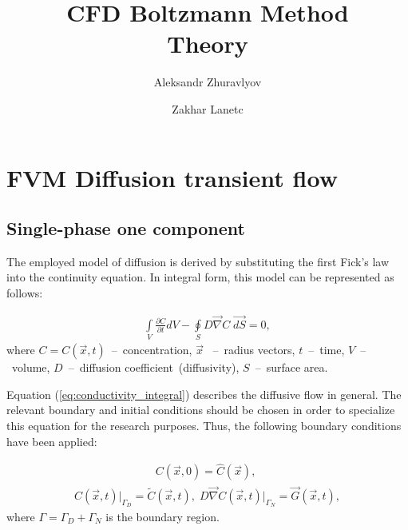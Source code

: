 \documentclass[a4paper,14pt,english]{extreport}
\author{Aleksandr Zhuravlyov \and Zakhar Lanetc}
\title{CFD Boltzmann Method\\Theory}
\date{\DTMnow}
\begin{document}
    \pagecolor{pageColor}
    \color{fontColor}

    \section*{FVM Diffusion transient flow}
    \subsection*{Single-phase one component}
    
The employed model of diffusion is derived by substituting the first Fick's law into the continuity equation. In integral form, this model can be represented as follows:

    \begin{eqnarray}
        \label{eq:conductivity_integral}
        \int \limits_{V} \frac{\partial C}{\partial t} d V - \oint \limits_{S} D \vec{\nabla}C \; \vec{dS} = 0,
    \end{eqnarray}
    where $C = C\left(\vec{x}, t\right)$~--~concentration, $\vec{x}$ ~--~radius vectors, $t$~--~time, $V$~--~volume, $D$~--~diffusion coefficient~(diffusivity), $S$~--~surface area.
    
Equation (\ref{eq:conductivity_integral}) describes the diffusive flow in general. The relevant boundary and initial conditions should be chosen in order to specialize this equation for the research purposes. Thus, the following boundary conditions have been applied:
    
    \begin{eqnarray}
        \label{eq:conductivity_init}
        C\left(\vec{x}, \mathit{0}\right) = \hat{C}\left(\vec{x}\right), \; 
     \end{eqnarray}
    \begin{eqnarray}
      \label{eq:conductivity_bound}
       C\left(\vec{x}, t\right)\Big|_{\mathit{\Gamma}_D} \!\!= \tilde{C}\left(\vec{x}, t\right), \; D \vec{\nabla}C \left(\vec{x}, t\right)\Big|_{\mathit{\Gamma}_N} \!\!= \vec{G}\left(\vec{x}, t\right),
    \end{eqnarray}
where $\mathit{\Gamma} = \mathit{\Gamma_D} + \mathit{\Gamma_N}$ is the boundary region.
\end{document}
